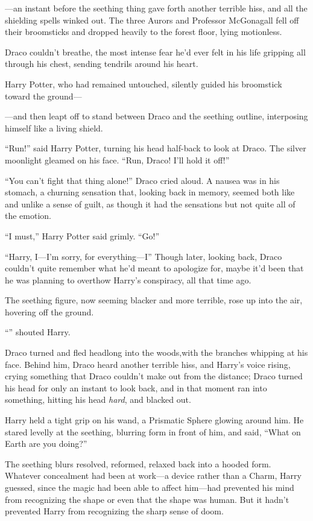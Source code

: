 \begin{em}
—an instant before the seething thing gave forth another terrible hiss, and all the shielding spells winked out. The three Aurors and Professor McGonagall fell off their broomsticks and dropped heavily to the forest floor, lying motionless.

Draco couldn’t breathe, the most intense fear he’d ever felt in his life gripping all through his chest, sending tendrils around his heart.

Harry Potter, who had remained untouched, silently guided his broomstick toward the ground—

—and then leapt off to stand between Draco and the seething outline, interposing himself like a living shield.

“Run!” said Harry Potter, turning his head half-back to look at Draco. The silver moonlight gleamed on his face. “Run, Draco! I’ll hold it off!”

“You can’t fight that thing alone!” Draco cried aloud. A nausea was in his stomach, a churning sensation that, looking back in memory, seemed both like and unlike a sense of guilt, as though it had the sensations but not quite all of the emotion.

“I must,” Harry Potter said grimly. “Go!”

“Harry, I—I’m sorry, for everything—I” Though later, looking back, Draco couldn’t quite remember what he’d meant to apologize for, maybe it’d been that he was planning to overthow Harry’s conspiracy, all that time ago.

The seething figure, now seeming blacker and more terrible, rose up into the air, hovering off the ground.

“” shouted Harry.

Draco turned and fled headlong into the woods,with the branches whipping at his face. Behind him, Draco heard another terrible hiss, and Harry’s voice rising, crying something that Draco couldn’t make out from the distance; Draco turned his head for only an instant to look back, and in that moment ran into something, hitting his head \emph{hard}, and blacked out.
\end{em}

\later

Harry held a tight grip on his wand, a Prismatic Sphere glowing around him. He stared levelly at the seething, blurring form in front of him, and said, “What on Earth are you doing?”

The seething blurs resolved, reformed, relaxed back into a hooded form. Whatever concealment had been at work—a device rather than a Charm, Harry guessed, since the magic had been able to affect him—had prevented his mind from recognizing the shape or even that the shape was human. But it hadn’t prevented Harry from recognizing the sharp sense of doom.

